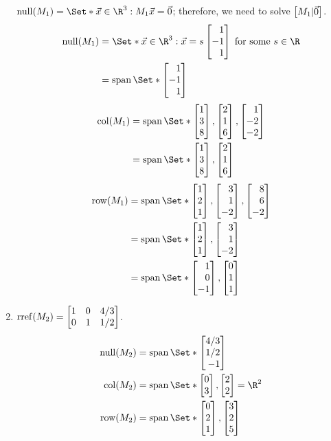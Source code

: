 \begin{exercises}
\begin{problist}
\begin{solution}
\begin{enumerate}
					$\Null(M_{1})=\Set*{\vec{x} \in \R^3: M_1 \vec{x}=\vec 0}$;
					therefore, we need to solve $\mat{M_1|\vec0}$.
					\begin{align*}
						\Null(M_{1}) &= \Set*{\vec x \in \R^3:\vec x = s\mat{1\\-1\\1} \; \text{for some } s\in\R}\\
						             &= \Span\Set*{\mat{1\\-1\\1}}
					\end{align*}
					\begin{align*}
						\Col(M_{1}) &= \Span\Set*{\mat{1\\3\\8},\mat{2\\1\\6},\mat{1\\-2\\-2}}\\
									&= \Span\Set*{\mat{1\\3\\8},\mat{2\\1\\6}}
					\end{align*}
					\begin{align*}
						\Row(M_{1}) &= \Span\Set*{\mat{1\\2\\1},\mat{3\\1\\-2},\mat{8\\6\\-2}}\\
									&= \Span\Set*{\mat{1\\2\\1},\mat{3\\1\\-2}}\\
									&= \Span\Set*{\mat{1\\0\\-1},\mat{0\\1\\1}}
					\end{align*}

				\item $\rref(M_{2})=\mat{1&0&4/3\\0&1&1/2}$.
					\begin{align*}
					\Null(M_{2})&=\Span\Set*{\mat{4/3\\1/2\\-1}}\\
					\Col(M_{2})&=\Span\Set*{\mat{0\\3},\mat{2\\2}}=\R^{2}\\
					\Row(M_{2})&=\Span\Set*{\mat{0\\2\\1},\mat{3\\2\\5}}
					\end{align*}


\end{enumerate}
\end{solution}
\end{problist}
\end{exercises}

